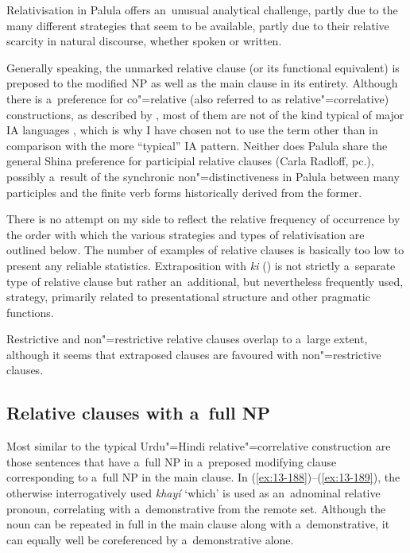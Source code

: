 Relativisation in Palula offers an~unusual analytical challenge, partly due to the many different strategies that seem to be available, partly due to their relative scarcity in natural discourse, whether spoken or written. 



Generally speaking, the unmarked relative clause (or its functional equivalent) is preposed to the modified NP as well as the main clause in its entirety. Although there is a~preference for co"=relative (also referred to as relative"=correlative) constructions, as described by \citet{downing1974}, most of them are not of the kind typical of major IA languages \citep[410--415]{masica1991}, which is why I have chosen not to use the term other than in comparison with the more ``typical'' IA pattern. Neither does Palula share the general Shina preference for participial relative clauses (Carla Radloff, pc.), possibly a~result of the synchronic non"=distinctiveness in Palula between many participles and the finite verb forms historically derived from the former.



There is no attempt on my side to reflect the relative frequency of occurrence by the order with which the various strategies and types of relativisation are outlined below. The number of examples of relative clauses is basically too low to present any reliable statistics. Extraposition with \textit{ki} () is not strictly a~separate type of relative clause but rather an~additional, but nevertheless frequently used, strategy, primarily related to presentational structure and other pragmatic functions.



Restrictive and non"=restrictive relative clauses overlap to a~large extent, although it seems that extraposed clauses are favoured with non"=restrictive clauses.


\subsection{Relative clauses with a~full NP}
\label{subsec:13-6-1}


Most similar to the typical Urdu"=Hindi relative"=correlative construction are those sentences that have a~full NP in a~preposed modifying clause corresponding to a~full NP in the main clause. In (\ref{ex:13-188})--(\ref{ex:13-189}), the otherwise interrogatively used \textit{khayí} `which' is used as an~adnominal relative pronoun, correlating with a~demonstrative from the remote set. Although the noun can be repeated in full in the main clause along with a~demonstrative, it can equally well be coreferenced by a~demonstrative alone.



